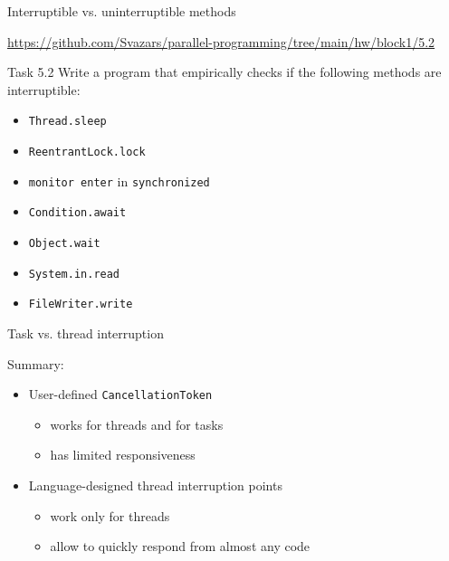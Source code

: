 \begin{frame}[t]{Interruptible vs. uninterruptible methods}

{\small\url{https://github.com/Svazars/parallel-programming/tree/main/hw/block1/5.2}}
\begin{homeworkmail}{Task 5.2}
  Write a program that empirically checks if the following methods are interruptible:
  \begin{itemize}
    \item \texttt{Thread.sleep}
    \item \texttt{ReentrantLock.lock}
    \item \texttt{monitor enter} in \texttt{synchronized}
    \item \texttt{Condition.await}
    \item \texttt{Object.wait}
    \item \texttt{System.in.read}
    \item \texttt{FileWriter.write}
  \end{itemize}
\end{homeworkmail}
\end{frame}

\begin{frame}[t]{Task vs. thread interruption}

Summary:
\begin{itemize}
    \item User-defined \texttt{CancellationToken} 
    \begin{itemize}
        \item works for threads and for tasks
        \item has limited responsiveness
    \end{itemize}
    \item Language-designed thread interruption points 
    \begin{itemize}
        \item work only for threads
        \item allow to quickly respond from almost any code
    \end{itemize}
\end{itemize}
\end{frame}


